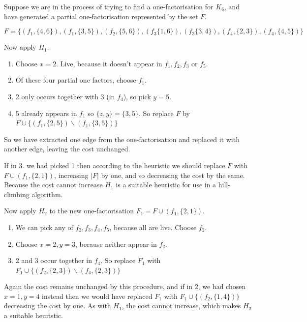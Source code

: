 \documentclass[11pt, a4paper]{book}\usepackage[]{graphicx}\usepackage[]{xcolor}
\newcounter{example}
\begin{document}
\begin{example}
Suppose we are in the process of trying to find a
one-factorisation for $K_6$, and have generated a partial
one-factorisation represented by the set $F$.

\begin{equation*}
F = \{(f_1,\{4,6\}),(f_1,\{3,5\}),(f_2,\{5,6\}),(f_3\{1,6\}), (f_3\{3,4\}),(f_4,\{2,3\}),(f_4,\{4,5\})\}
\end{equation*}

Now apply $H_1$.

\begin{enumerate}
  \item{Choose $x = 2$. Live, because it doesn’t appear in $f_1, f_2, f_3$ or $f_5$.}
  \item{Of these four partial one factors, choose $f_1$.}
  \item{2 only occurs together with 3 (in $f_4$), so pick $y = 5$.}
  \item{5 already appears in $f_1$ so $\{z, y\} = \{3, 5\}$.
     So replace $F$ by
     $F \cup \{(f_1, \{2, 5\}) \backslash (f_1, \{3, 5\})\}$}
\end{enumerate}

So we have extracted one edge from the one-factorisation and
replaced it with another edge, leaving the cost unchanged.

If in 3. we had picked 1 then according to the heuristic we
should replace $F$ with $F \cup (f_1, \{2, 1\})$, increasing
$|F|$ by one, and so decreasing the cost by the same. Because
the cost cannot increase $H_1$ is a suitable heuristic for use
in a hill-climbing algorithm.

Now apply $H_2$ to the new one-factorisation
$F_1 = F \cup (f_1, \{2, 1\})$.

\begin{enumerate}
  \item{We can pick any of $f_2, f_3, f_4, f_5$, because all are live. Choose $f_2$.}
  \item{Choose $x = 2, y = 3$, because neither appear in $f_2$.}
  \item{2 and 3 occur together in $f_4$. So replace $F_1$
     with
     $F_1 \cup \{(f_2, \{2, 3\}) \backslash (f_4, \{2, 3\})\}$}
\end{enumerate}

Again the cost remains unchanged by this procedure,
and if in 2, we had chosen $x = 1, y = 4$ instead then
we would have replaced $F_1$ with
$F_1 \cup \{(f_2, \{1, 4\})\}$
decreasing the cost by one. As with $H_1$,
the cost cannot increase, which makes $H_2$ a suitable
heuristic.
\end{example}
\end{document}
